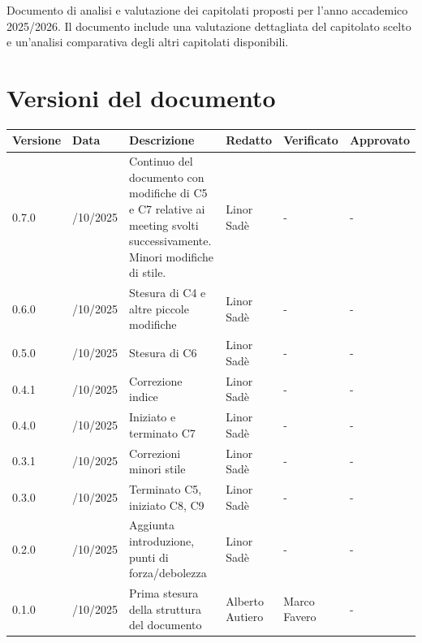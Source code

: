 \documentclass[a4paper,11pt]{article}
\newcommand{\CurrentVersion}{0.7.0} %
\begin{document}
\vspace{0.5cm}

\begin{center}
\begin{tcolorbox}[colback=secondaryblue!10,colframe=secondaryblue,width=0.9\textwidth,arc=3mm,boxrule=0.8pt,title={\bfseries Abstract}]
Documento di analisi e valutazione dei capitolati proposti per l'anno accademico 2025/2026. Il documento include una valutazione dettagliata del capitolato scelto e un'analisi comparativa degli altri capitolati disponibili.
\end{tcolorbox}
\end{center}

\newpage
\section{Versioni del documento}

\setlength{\extrarowheight}{2pt} %
\renewcommand{\arraystretch}{1.5} 

{\footnotesize
\begin{tabularx}{\textwidth}{|>{\raggedright\arraybackslash}p{1.5cm}|>{\raggedright\arraybackslash}p{2cm}|X|>{\raggedright\arraybackslash}p{2cm}|>{\raggedright\arraybackslash}p{2cm}|>{\raggedright\arraybackslash}p{2cm}|}
\hline
\rowcolor{primaryblue!40}
\textbf{\color{white} Versione} & \textbf{\color{white} Data} & \textbf{\color{white} Descrizione} & \textbf{\color{white} Redatto} & \textbf{\color{white} Verificato} & \textbf{\color{white} Approvato} \\
\hline
\rowcolor{secondaryblue!10} \CurrentVersion & 24/10/2025 & Continuo del documento con modifiche di C5 e C7 relative ai meeting svolti successivamente. Minori modifiche di stile. & Linor Sadè & - & - \\
\hline
\rowcolor{secondaryblue!10} 0.6.0 & 24/10/2025 & Stesura di C4 e altre piccole modifiche & Linor Sadè & - & - \\
\hline
\rowcolor{secondaryblue!10} 0.5.0 & 23/10/2025 & Stesura di C6 & Linor Sadè & - & - \\
\hline
\rowcolor{secondaryblue!10} 0.4.1 & 22/10/2025 & Correzione indice & Linor Sadè & - & - \\
\hline
\rowcolor{secondaryblue!10} 0.4.0 & 22/10/2025 & Iniziato e terminato C7 & Linor Sadè & - & - \\
\hline
\rowcolor{secondaryblue!10} 0.3.1 & 22/10/2025 & Correzioni minori stile & Linor Sadè & - & - \\
\hline
\rowcolor{secondaryblue!10} 0.3.0 & 21/10/2025 & Terminato C5, iniziato C8, C9 & Linor Sadè & - & - \\
\hline
\rowcolor{secondaryblue!10} 0.2.0 & 21/10/2025 & Aggiunta introduzione, punti di forza/debolezza & Linor Sadè & - & - \\
\hline
\rowcolor{secondaryblue!10} 0.1.0 & 20/10/2025 & Prima stesura della struttura del documento & Alberto Autiero & Marco Favero & - \\
\hline
\end{tabularx}
}
\end{document}
